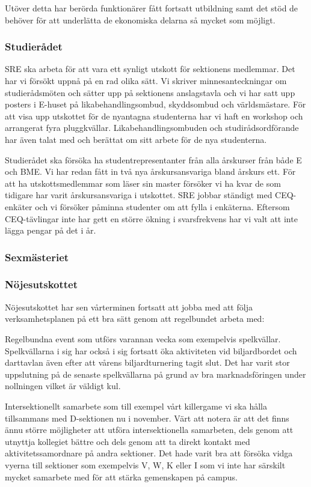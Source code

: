 \documentclass[../_main/handlingar.tex]{subfiles}
\begin{document}
Utöver detta har berörda funktionärer fått fortsatt utbildning samt det stöd de behöver för att underlätta de ekonomiska delarna så mycket som möjligt. 
\subsubsection*{Studierådet}
SRE ska arbeta för att vara ett synligt utskott för sektionens medlemmar. Det har vi försökt uppnå på en rad olika sätt. Vi skriver minnesanteckningar om studierådsmöten och sätter upp på sektionens anslagstavla och vi har satt upp posters i E-huset på likabehandlingsombud, skyddsombud och världsmästare. För att visa upp utskottet för de nyantagna studenterna har vi haft en workshop och arrangerat fyra pluggkvällar. Likabehandlingsombuden och studirådsordförande har även talat med och berättat om sitt arbete för de nya studenterna. 

Studierådet ska försöka ha studentrepresentanter från alla årskurser från både E och BME. Vi har redan fått in två nya årskursansvariga bland årskurs ett. För att ha utskottsmedlemmar som läser sin master försöker vi ha kvar de som tidigare har varit årskursansvariga i utskottet. SRE jobbar ständigt med CEQ-enkäter och vi försöker påminna studenter om att fylla i enkäterna. Eftersom CEQ-tävlingar inte har gett en större ökning i svarsfrekvens har vi valt att inte lägga pengar på det i år. 
\subsubsection*{Sexmästeriet}

\subsubsection*{Nöjesutskottet}
Nöjesutskottet har sen vårterminen fortsatt att jobba med att följa verksamhetsplanen på ett bra sätt genom att regelbundet arbeta med: 

Regelbundna event som utförs varannan vecka som exempelvis spelkvällar. Spelkvällarna i sig har också i sig fortsatt öka aktiviteten vid biljardbordet och darttavlan även efter att vårens biljardturnering tagit slut. Det har varit stor uppslutning på de senaste spelkvällarna på grund av bra marknadsföringen under nollningen vilket är väldigt kul.

Intersektionellt samarbete som till exempel vårt killergame vi ska hålla tillsammans med D-sektionen nu i november. Värt att notera är att det finns ännu större möjligheter att utföra intersektionella samarbeten, dels genom att utnyttja kollegiet bättre och dels genom att ta direkt kontakt med aktivitetssamordnare på andra sektioner. Det hade varit bra att försöka vidga vyerna till sektioner som exempelvis V, W, K eller I som vi inte har särskilt mycket samarbete med för att stärka gemenskapen på campus. 
\end{document}
